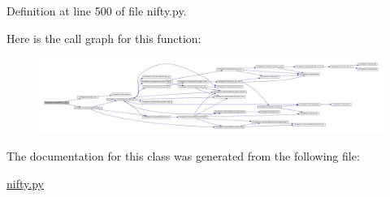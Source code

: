 \-Definition at line 500 of file nifty.\-py.



\-Here is the call graph for this function\-:
\nopagebreak
\begin{figure}[H]
\begin{center}
\leavevmode
\includegraphics[width=350pt]{classforcebalance_1_1nifty_1_1Pickler__LP_af59a709f44c96a91c753ce02cff07ae8_cgraph}
\end{center}
\end{figure}




\-The documentation for this class was generated from the following file\-:\begin{DoxyCompactItemize}
\item 
\hyperlink{nifty_8py}{nifty.\-py}\end{DoxyCompactItemize}
